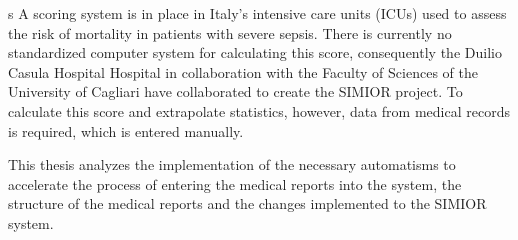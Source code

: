\vspace{4cm}s
A scoring system is in place in Italy's intensive care units (ICUs) used to assess the risk of mortality in patients with severe sepsis. There is currently no standardized computer system for calculating this score, consequently the Duilio Casula Hospital Hospital in collaboration with the Faculty of Sciences of the University of Cagliari have collaborated to create the SIMIOR project. To calculate this score and extrapolate statistics, however, data from medical records is required, which is entered manually.
\par\bigskip
This thesis analyzes the implementation of the necessary automatisms to accelerate the process of entering the medical reports into the system, the structure of the medical reports and the changes implemented to the SIMIOR system.